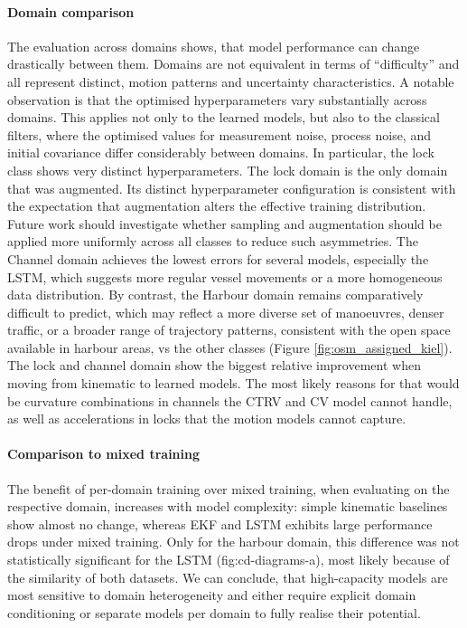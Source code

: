 \paragraph{Domain comparison}
The evaluation across domains shows, that model performance can change drastically between them. Domains are not equivalent in terms of \enquote{difficulty} and all represent distinct, motion patterns and uncertainty characteristics. 
A notable observation is that the optimised hyperparameters vary substantially across domains. This applies not only to the learned models, but also to the classical filters, where the optimised values for measurement noise, process noise, and initial covariance differ considerably between domains.  In particular, the lock class shows very distinct hyperparameters. The lock domain is the only domain that was augmented. Its distinct hyperparameter configuration is consistent with the expectation that augmentation alters the effective training distribution.  Future work should investigate whether sampling and augmentation should be applied more uniformly across all classes to reduce such asymmetries. 
The Channel domain achieves the lowest errors for several models, especially the \ac{LSTM}, which suggests more regular vessel movements or a more homogeneous data distribution. By contrast, the Harbour domain remains comparatively difficult to predict, which may reflect a more diverse set of manoeuvres, denser traffic, or a broader range of trajectory patterns, consistent with the open space available in harbour areas, vs the other classes (Figure \ref{fig:osm_assigned_kiel}). The lock and channel domain show the biggest relative  improvement when moving from kinematic to learned models. The most likely reasons for that would be curvature combinations in channels the \ac{CTRV} and \ac{CV} model cannot handle, as well as accelerations in locks that the motion models cannot capture.
 \paragraph{Comparison to mixed training}  
         The benefit of per-domain training over mixed training, when evaluating on the respective domain, increases with model complexity: simple kinematic baselines show almost no change, whereas EKF and \ac{LSTM} exhibits large performance drops under mixed training.  Only for the harbour domain, this difference was not statistically significant for the \ac{LSTM} ({fig:cd-diagrams-a}), most likely because of the similarity of both datasets.  We can conclude, that high-capacity models are most sensitive to domain heterogeneity and either require explicit domain conditioning or separate models per domain to fully realise their potential. 

